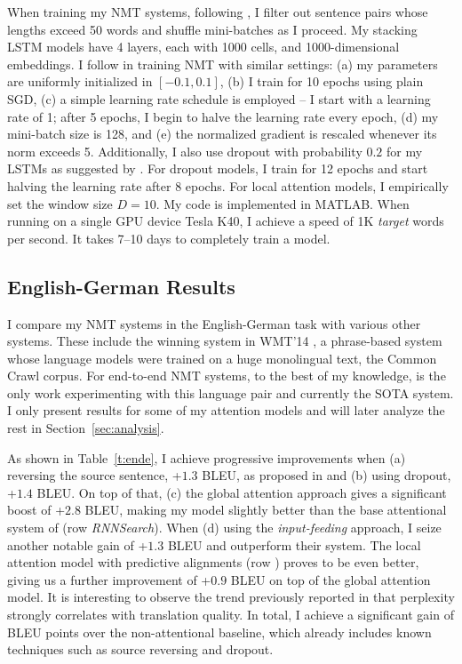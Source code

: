 When training my NMT systems, following \cite{bog15,jean15}, I filter out
sentence pairs whose lengths exceed 50 words and shuffle mini-batches as I
proceed. My stacking LSTM models have 4 layers, each with 1000 cells, and
1000-dimensional embeddings. I follow \cite{sutskever14,luong15} in training
NMT with similar settings: (a) my parameters are uniformly initialized in
$[-0.1, 0.1]$, (b) I train for 10 epochs using plain SGD, (c) a simple learning
rate schedule is employed -- I start with a learning rate of 1; after 5 epochs,
I begin to halve the learning rate every epoch, (d) my mini-batch size is 128,
and (e) the normalized gradient is rescaled whenever its norm exceeds 5.
Additionally, I also use dropout with probability $0.2$ for my LSTMs as suggested by
\cite{zaremba14}. For dropout models, I train for 12 epochs and start halving
the learning rate after 8 epochs. For local
attention models, I empirically set the window size $D=10$.
My code is implemented in MATLAB.
When running on a single GPU device Tesla K40, I achieve a speed of 1K {\it
target} words per second. It takes 7--10 days to completely train a model.

\subsection{English-German Results}
I compare my NMT systems in the English-German task with various other
systems. These include the winning system in WMT'14
\cite{buck14}, a phrase-based system whose language models were trained on a
huge monolingual text, the Common Crawl corpus. For end-to-end NMT systems, to the best of my knowledge, \cite{jean15} is the only work experimenting with this language pair and currently the SOTA system.
I only present results for some of my attention models and will later
analyze the rest in Section~\ref{sec:analysis}. 

\begin{sloppypar}
As shown in Table~\ref{t:ende}, I achieve progressive improvements when
(a) reversing the source sentence, +$1.3$ BLEU, as proposed in \cite{sutskever14}
and (b) using dropout, +$1.4$ BLEU. On top of that, (c) the global
attention approach gives a significant boost of +$2.8$ BLEU, making 
 my model slightly better than the base attentional system of
  (row {\it RNNSearch}). When (d) using the {\it input-feeding}
approach, I seize another notable gain of +$1.3$ BLEU and outperform their
system. The local attention model with predictive alignments (row {\it \localp}) proves
to be even better, giving us a further improvement of +$0.9$ BLEU on top of the
global attention model. 
It is interesting to observe the trend previously reported in
\cite{luong15} that perplexity strongly correlates with translation quality.
In total, I achieve a significant gain of
\attngain{} BLEU points over the non-attentional baseline, which already includes
known techniques such as source reversing and dropout.
\end{sloppypar}

